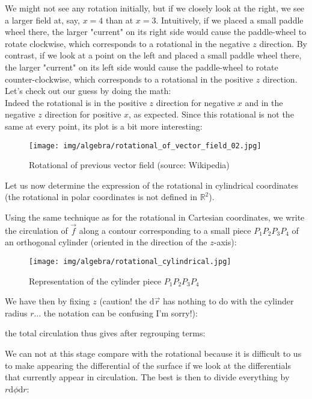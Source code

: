 	\begin{tcolorbox}[colframe=black,colback=white,sharp corners]
	We might not see any rotation initially, but if we closely look at the right, we see a larger field at, say, $x=4$ than at $x=3$. Intuitively, if we placed a small paddle wheel there, the larger "current" on its right side would cause the paddle-wheel to rotate clockwise, which corresponds to a rotational in the negative $z$ direction. By contrast, if we look at a point on the left and placed a small paddle wheel there, the larger "current" on its left side would cause the paddle-wheel to rotate counter-clockwise, which corresponds to a rotational in the positive $z$ direction. Let's check out our guess by doing the math:\\
	
	Indeed the rotational is in the positive $z$ direction for negative $x$ and in the negative $z$ direction for positive $x$, as expected. Since this rotational is not the same at every point, its plot is a bit more interesting:
	\begin{figure}[H]
		\centering
		\texttt{[image: img/algebra/rotational\_of\_vector\_field\_02.jpg]}
		\caption[]{Rotational of previous vector field (source: Wikipedia)}
	\end{figure}
	\end{tcolorbox}
	\pagebreak	
	Let us now determine the expression of the rotational in cylindrical coordinates (the rotational in polar coordinates is not defined in $\mathbb{R}^2$).
	
	Using the same technique as for the rotational in Cartesian coordinates, we write the circulation of $\vec{f}$ along a contour corresponding to a small piece $P_1P_2P_3P_4$ of an orthogonal cylinder (oriented in the direction of the $z$-axis):
	\begin{figure}[H]
		\centering
		\texttt{[image: img/algebra/rotational\_cylindrical.jpg]}
		\caption[]{Representation of the cylinder piece $P_1P_2P_3P_4$}
	\end{figure}
	We have then by fixing $z$ (caution! the $\mathrm{d}\vec{r}$ has nothing to do with the cylinder radius $r$... the notation can be confusing I'm sorry!):
	
	the total circulation thus gives after regrouping terms:
	
	We can not at this stage compare with the rotational because it is difficult to us to make appearing the differential of the surface if we look at the differentials that currently appear in circulation. The best is then to divide everything by $r\mathrm{d}\phi\mathrm{d}r$:
	
